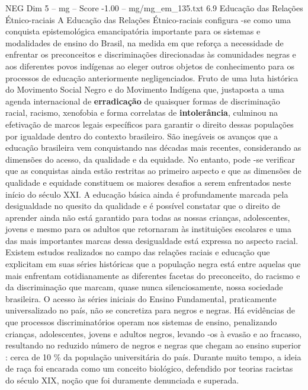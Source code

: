 \begin{textsample}{NEG Dim 5 – mg – Score -1.00 – mg/mg\_em\_135.txt}  \label{ex:f5_neg_106}
6.9 Educação das Relações Étnico-raciais A Educação das Relações Étnico-raciais configura -se como uma conquista epistemológica emancipatória importante para os sistemas e modalidades de ensino do Brasil, na medida em que reforça a necessidade de enfrentar os preconceitos e discriminações direcionadas às comunidades negras e aos diferentes povos indígenas ao eleger outros objetos de conhecimento para os processos de educação anteriormente negligenciados.
Fruto de uma luta histórica do Movimento Social Negro e do Movimento Indígena que, justaposta a uma agenda internacional de \textbf{erradicação} de quaisquer formas de discriminação racial, racismo, xenofobia e forma correlatas de \textbf{intolerância}, culminou na efetivação de marcos legais específicos para garantir o direito dessas populações por igualdade dentro do contexto brasileiro.
São inegáveis os avanços que a educação brasileira vem conquistando nas décadas mais recentes, considerando as dimensões do acesso, da qualidade e da equidade.
No entanto, pode -se verificar que as conquistas ainda estão restritas ao primeiro aspecto e que as dimensões de qualidade e equidade constituem os maiores desafios a serem enfrentados neste início do século XXI.
A educação básica ainda é profundamente marcada pela desigualdade no quesito da qualidade e é possível constatar que o direito de aprender ainda não está garantido para todas as nossas crianças, adolescentes, jovens e mesmo para os adultos que retornaram às instituições escolares e uma das mais importantes marcas dessa desigualdade está expressa no aspecto racial.
Existem estudos realizados no campo das relações raciais e educação que explicitam em suas séries históricas que a população negra está entre aquelas que mais enfrentam cotidianamente as diferentes facetas do preconceito, do racismo e da discriminação que marcam, quase nunca silenciosamente, nossa sociedade brasileira.
O acesso às séries iniciais do Ensino Fundamental, praticamente universalizado no país, não se concretiza para negros e negras.
Há evidências de que processos discriminatórios operam nos sistemas de ensino, penalizando crianças, adolescentes, jovens e adultos negros, levando -os à evasão e ao fracasso, resultando no reduzido número de negros e negras que chegam ao ensino superior : cerca de 10 \% da população universitária do país.
Durante muito tempo, a ideia de raça foi encarada como um conceito biológico, defendido por teorias racistas do século XIX, noção que foi duramente denunciada e superada.

\end{textsample}
